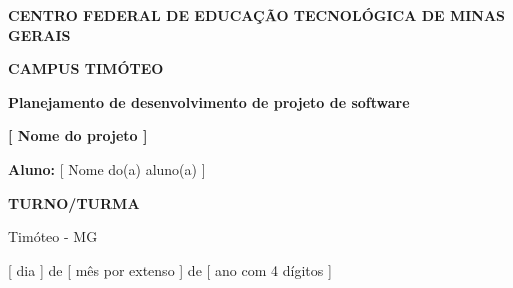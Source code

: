 \begin{center}

\begin{Large}
    \textbf{CENTRO FEDERAL DE EDUCAÇÃO TECNOLÓGICA DE MINAS GERAIS }
\end{Large}

\vspace{0.5cm}

\begin{normalsize}
    \textbf{CAMPUS TIMÓTEO}
\end{normalsize}

\vspace{5cm}

\begin{Huge}

    \textbf{Planejamento de desenvolvimento de projeto de software}
    
    \vspace{0.5cm}
    
   \textbf{ {\color{red}[ Nome do projeto ]}}
    
\end{Huge}

\vspace{5cm}

\textbf{Aluno: } {\color{red} [ Nome do(a) aluno(a) ]}

\vspace{0.5cm}

\textbf{{\color{red}TURNO/TURMA}}

\vspace{2cm}

Timóteo - MG

\vspace{1cm}

{\color{red} [ dia ]} de {\color{red} [ mês por extenso ] } de {\color{red} [ ano com 4 dígitos ] }

\end{center}

\newpage